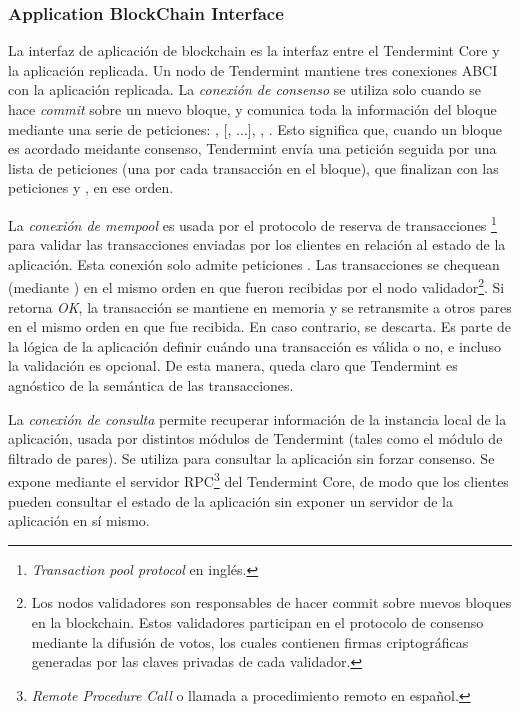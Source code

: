 \subsubsection{Application BlockChain Interface}\label{subsec:abci}
La interfaz de aplicación de blockchain es la interfaz entre el Tendermint Core y la aplicación replicada.
%
Un nodo de Tendermint mantiene tres conexiones ABCI con la aplicación replicada.
%
La \textit{conexión de consenso} se utiliza solo cuando se hace \textit{commit} sobre un nuevo bloque,
y comunica toda la información del bloque mediante una serie de peticiones: 
\BeginBlock, [\DeliverTx, ...], \EndBlock, \Commit.
%
Esto significa que, cuando un bloque es acordado meidante consenso, Tendermint envía una petición \BeginBlock
seguida por una lista de peticiones \DeliverTx (una por cada transacción en el bloque), que finalizan con las
peticiones \EndBlock y \Commit, en ese orden.

%

La \textit{conexión de mempool} es usada por el protocolo de reserva de transacciones \footnote{\textit{Transaction pool protocol}
en inglés.} para validar las transacciones enviadas por los clientes en relación al estado de la aplicación.
%
Esta conexión solo admite peticiones \CheckTx. Las transacciones se chequean (mediante \CheckTx) en el mismo orden
en que fueron recibidas por el nodo validador\footnote{Los nodos validadores son responsables de hacer commit sobre nuevos
bloques en la blockchain. Estos validadores participan en el protocolo de consenso mediante la difusión de votos, los
cuales contienen firmas criptográficas generadas por las claves privadas de cada validador.}.
%
Si \CheckTx retorna \textit{OK}, la transacción se mantiene en memoria y se retransmite a otros pares en el mismo orden
en que fue recibida.
%
En caso contrario, se descarta.
%
Es parte de la lógica de la aplicación definir cuándo una transacción es válida o no, e incluso la validación es opcional.
%
De esta manera, queda claro que Tendermint es agnóstico de la semántica de las transacciones.

%

La \textit{conexión de consulta} permite recuperar información de la instancia local de la aplicación, usada
por distintos módulos de Tendermint (tales como el módulo de filtrado de pares).
%
Se utiliza para consultar la aplicación sin forzar consenso.
%
Se expone mediante el servidor RPC\footnote{\textit{Remote Procedure Call} o llamada a procedimiento
remoto en español.} del Tendermint Core, de modo que los clientes pueden
consultar el estado de la aplicación sin exponer un servidor de la aplicación en sí mismo. 

